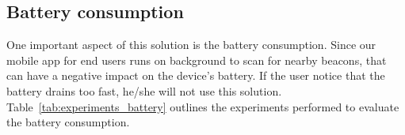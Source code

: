 %
%
%
% 
%
\subsection{Battery consumption}
\label{sub:methodology_battery_consumption}
One important aspect of this solution is the battery consumption.
Since our mobile app for end users runs on background to scan for nearby beacons, that can have a negative impact on the device's battery. If the user notice that the battery drains too fast, he/she will not use this solution.
Table~\ref{tab:experiments_battery} outlines the experiments performed to evaluate the battery consumption.

